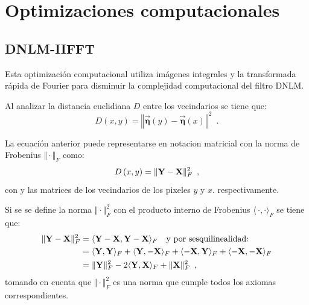 \section{Optimizaciones computacionales}
\label{ch:marco_opt}

\subsection{DNLM-IIFFT}
\label{ch:marco_dnlmifft}

Esta optimización computacional utiliza im\'agenes integrales y la transformada r\'apida de Fourier para disminuir la complejidad computacional del filtro DNLM. 



Al analizar la distancia euclidiana $D$ entre los vecindarios se tiene que:
%
\begin{equation}
D\left(x,y\right)=\left\Vert \vec{\boldsymbol{\eta}}\left(y\right)-\vec{\boldsymbol{\eta}}\left(x\right)\right\Vert^2 \enspace . 
\end{equation}

La ecuación anterior puede representarse en notacion matricial con la norma de Frobenius $\Vert \cdot \Vert_{F}$ como:
%
\begin{equation}
D\left(x,y\right)=\Vert \mathbf{Y} - \mathbf{X} \Vert_{F}^2 \enspace ,
\label{eq:distMat}
\end{equation}
%
con  y  las matrices de los vecindarios de los pixeles $y$ y $x$. respectivamente.

Si se se define la norma $\Vert \cdot \Vert_{F}^2$ con el producto interno de Frobenius $\langle\,\cdot,\cdot\rangle_{F}$ se tiene que:
%
\begin{equation}\label{eq:frobProd}
\begin{split}
\Vert \mathbf{Y} - \mathbf{X} \Vert_{F}^2 & = \langle\mathbf{Y} - \mathbf{X},\mathbf{Y} - \mathbf{X}\rangle_{F}  \quad \text{y por sesquilinealidad:}\\ 
& = \langle\mathbf{Y},\mathbf{Y}\rangle_{F} + \langle\mathbf{Y},-\mathbf{X}\rangle_{F} + \langle-\mathbf{X},\mathbf{Y}\rangle_{F} + \langle-\mathbf{X},-\mathbf{X}\rangle_{F}\\
& = \Vert \mathbf{Y} \Vert_{F}^2 -2\langle\mathbf{Y},\mathbf{X}\rangle_{F} + \Vert \mathbf{X} \Vert_{F}^2 \enspace ,
\end{split} 
\end{equation}
%
tomando en cuenta que $\Vert \cdot \Vert_{F}^2$ es una norma que cumple todos los axiomas correspondientes. 

